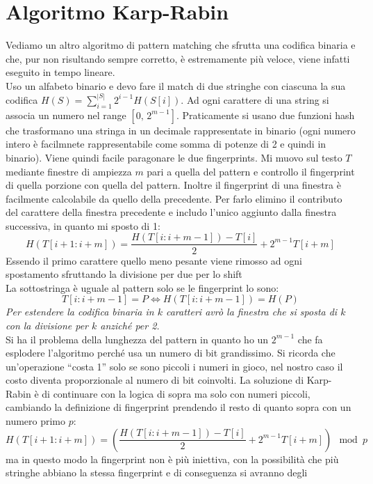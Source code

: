 \documentclass[a4paper,12pt, oneside]{book}
\begin{document}
\section{Algoritmo Karp-Rabin}
Vediamo un altro algoritmo di pattern matching che sfrutta una
codifica binaria e che, pur non risultando sempre corretto, è estremamente
più veloce, viene infatti eseguito in tempo lineare.\\
Uso un alfabeto binario e devo fare il match di due stringhe con
ciascuna la sua codifica $H(S)=\sum_{i=1}^{|S|}2^{i-1}H(S[i])$.
Ad ogni carattere di una string si associa un numero nel range $[0,\,
2^{m-1}]$. Praticamente si usano due funzioni hash che trasformano una
stringa in un decimale rappresentate in binario (ogni numero intero è
facilmnete rappresentabile come somma di potenze di 2 e quindi in
binario). Viene quindi facile paragonare le due fingerprints.
Mi muovo sul testo $T$ mediante finestre di ampiezza $m$ pari a quella
del pattern e controllo il fingerprint di quella porzione con quella
del pattern. Inoltre il fingerprint di una finestra è facilmente
calcolabile da quello della precedente. Per farlo elimino il
contributo del carattere della finestra precedente e includo l'unico
aggiunto dalla finestra successiva, in quanto mi sposto di 1:
\[H(T [i + 1 : i + m]) = \frac{H(T [i : i + m - 1]) −T [i]}{2} +
  2^{m-1} T [i + m]\]
Essendo il primo carattere quello meno pesante viene rimosso ad ogni
spostamento sfruttando la divisione per due per lo shift
\\
La sottostringa è uguale al pattern solo se le fingerprint lo sono:
\[T [i : i + m - 1] = P \Leftrightarrow H(T [i : i + m - 1]) = H(P)\]
\textit{Per estendere la codifica binaria in $k$ caratteri avrò la finestra
  che si sposta di $k$ con la divisione per $k$ anziché per 2.}\\
Si ha il problema della lunghezza del pattern in quanto ho un
$2^{m-1}$ che fa esplodere l'algoritmo perché usa un numero di
bit grandissimo. Si ricorda che un'operazione ``costa 1'' solo se sono
piccoli i numeri in gioco, nel nostro caso il costo diventa
proporzionale al numero di bit coinvolti. La soluzione di Karp-Rabin è
di continuare con la logica di sopra ma solo con numeri piccoli,
cambiando la definizione di fingerprint prendendo il resto di quanto
sopra con un numero primo $p$:
\[H(T [i + 1 : i + m]) = \left(\frac{H(T [i : i + m - 1]) −T [i]}{2} +
    2^{m-1} T [i + m]\right)\mod p\]
ma in questo modo la fingerprint non è più iniettiva, con la possibilità che
più stringhe abbiano la stessa fingerprint e di conseguenza si avranno degli 
\end{document}
